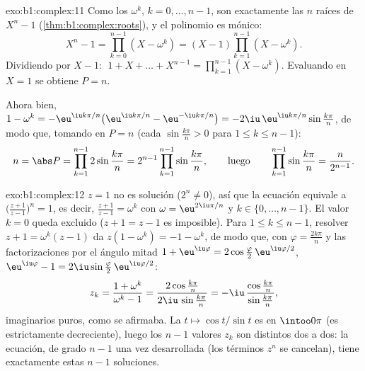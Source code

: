 \begin{solution}{exo:b1:complex:11}
Como los $\omega^k$, $k = 0, \dots, n-1$, son exactamente las $n$
raíces de $X^n - 1$ (\cref{thm:b1:complex:roots}), y el polinomio es
mónico:
\[
X^n - 1 = \prod_{k=0}^{n-1} (X - \omega^k)
= (X - 1) \prod_{k=1}^{n-1} (X - \omega^k).
\]
Dividiendo por $X - 1$: $\;1 + X + \dots + X^{n-1} =
\prod_{k=1}^{n-1} (X - \omega^k)$. Evaluando en $X = 1$ se obtiene $P = n$.

Ahora bien, $1 - \omega^k = -\eu^{\iu k\pi/n}\bigl(\eu^{\iu k\pi/n} -
\eu^{-\iu k\pi/n}\bigr) = -2\iu\,\eu^{\iu k\pi/n} \sin\frac{k\pi}{n}$,
de modo que, tomando  en $P = n$ (cada $\sin\frac{k\pi}n > 0$
para $1 \leq k \leq n-1$):
\[
n = \abs P = \prod_{k=1}^{n-1} 2\sin\frac{k\pi}{n}
= 2^{n-1} \prod_{k=1}^{n-1} \sin\frac{k\pi}{n},
\qquad\text{luego}\qquad
\prod_{k=1}^{n-1} \sin\frac{k\pi}{n} = \frac{n}{2^{n-1}} .
\]
\end{solution}

\begin{solution}{exo:b1:complex:12}
$z = 1$ no es solución ($2^n \neq 0$), así que la ecuación equivale a
$\bigl(\frac{z+1}{z-1}\bigr)^n = 1$, es decir,
$\frac{z+1}{z-1} = \omega^k$ con $\omega = \eu^{2\iu\pi/n}$ y
$k \in \{0, \dots, n-1\}$. El valor $k = 0$ queda excluido ($z + 1 =
z - 1$ es imposible). Para $1 \leq k \leq n - 1$, resolver
$z + 1 = \omega^k(z - 1)$ da $z(1 - \omega^k) = -1 - \omega^k$, de modo
que, con $\varphi = \frac{2k\pi}{n}$ y las factorizaciones por el
ángulo mitad $1 + \eu^{\iu\varphi} = 2\cos\frac\varphi2\,
\eu^{\iu\varphi/2}$, $\eu^{\iu\varphi} - 1 = 2\iu\sin\frac\varphi2
\,\eu^{\iu\varphi/2}$:
\[
z_k = \frac{1 + \omega^k}{\omega^k - 1}
= \frac{2\cos\frac{k\pi}{n}}{2\iu\,\sin\frac{k\pi}{n}}
= -\iu\,\frac{\cos\frac{k\pi}{n}}{\sin\frac{k\pi}{n}} ,
\]
imaginarios puros, como se afirmaba. La 
$t \mapsto \cos t/\sin t$ es  en $\intoo0\pi$ (es
estrictamente decreciente), luego los $n - 1$ valores $z_k$ son
distintos dos a dos: la ecuación, de grado $n - 1$ una vez desarrollada
(los términos $z^n$ se cancelan), tiene exactamente estas $n - 1$
soluciones.
\end{solution}

